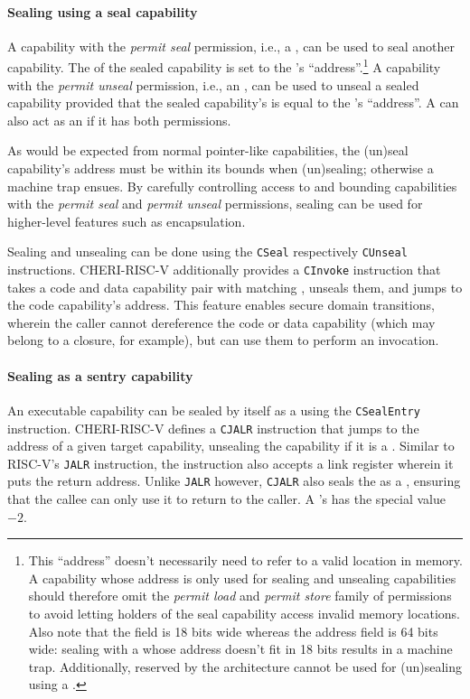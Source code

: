 \documentclass[main.tex]{subfiles}
\begin{document}
\paragraph{Sealing using a seal capability} A capability with the \emph{permit seal} permission, i.e., a \textbf{}, can be used to seal another capability. The  of the sealed capability is set to the 's \enquote{address}.\footnote{This \enquote{address} doesn't necessarily need to refer to a valid location in memory. A capability whose address is only used for sealing and unsealing capabilities should therefore omit the \emph{permit load} and \emph{permit store} family of permissions to avoid letting holders of the seal capability access invalid memory locations. Also note that the  field is 18 bits wide whereas the address field is 64 bits wide: sealing with a  whose address doesn't fit in 18 bits results in a machine trap. Additionally,  reserved by the architecture cannot be used for (un)sealing using a .} A capability with the \emph{permit unseal} permission, i.e., an \textbf{}, can be used to unseal a sealed capability provided that the sealed capability's  is equal to the 's \enquote{address}. A  can also act as an  if it has both permissions.

As would be expected from normal pointer-like capabilities, the (un)seal capability's address must be within its bounds when (un)sealing; otherwise a machine trap ensues. By carefully controlling access to and bounding capabilities with the \emph{permit seal} and \emph{permit unseal} permissions, sealing can be used for higher-level features such as encapsulation.

Sealing and unsealing can be done using the \texttt{CSeal} respectively \texttt{CUnseal} instructions. CHERI-RISC-V additionally provides a \texttt{CInvoke} instruction that takes a code and data capability pair with matching , unseals them, and jumps to the code capability's address. This feature enables secure domain transitions, wherein the caller cannot dereference the code or data capability (which may belong to a closure, for example), but can use them to perform an invocation.

\paragraph{Sealing as a sentry capability} An executable capability can be sealed by itself as a \textbf{} using the \texttt{CSealEntry} instruction. CHERI-RISC-V defines a \texttt{CJALR} instruction that jumps to the address of a given target capability, unsealing the capability if it is a . Similar to RISC-V's \texttt{JALR} instruction, the instruction also accepts a link register wherein it puts the return address. Unlike \texttt{JALR} however, \texttt{CJALR} also seals the  as a , ensuring that the callee can only use it to return to the caller. A 's  has the special value $-2$.

\biblio{}
\onlyinsubfile{\glsaddall\printglossaries}
\end{document}
